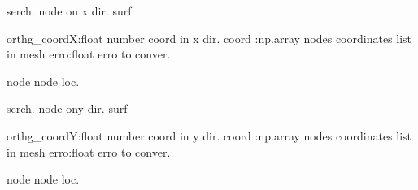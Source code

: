 \documentclass[letterpaper,10pt,english]{sphinxmanual}
\begin{document}

\begin{fulllineitems}
\label{\detokenize{myfempy.felib.physics:myfempy.felib.physics.getnode.search_surfyz}}
\pysigstartsignatures
{}
\pysigstopsignatures
\sphinxAtStartPar
serch. node on x dir. surf
\begin{description}
\sphinxAtStartPar
orthg\_coordX:float  \textendash{} number coord in x dir.
coord :np.array     \textendash{} nodes coordinates list in mesh
erro:float          \textendash{} erro to conver.

\sphinxAtStartPar
node                \textendash{} node loc.

\end{description}

\end{fulllineitems}


\begin{fulllineitems}
\label{\detokenize{myfempy.felib.physics:myfempy.felib.physics.getnode.search_surfzx}}
\pysigstartsignatures
{}
\pysigstopsignatures
\sphinxAtStartPar
serch. node ony dir. surf
\begin{description}
\sphinxAtStartPar
orthg\_coordY:float  \textendash{} number coord in y dir.
coord :np.array     \textendash{} nodes coordinates list in mesh
erro:float          \textendash{} erro to conver.

\sphinxAtStartPar
node                \textendash{} node loc.

\end{description}

\end{fulllineitems}
\end{document}

